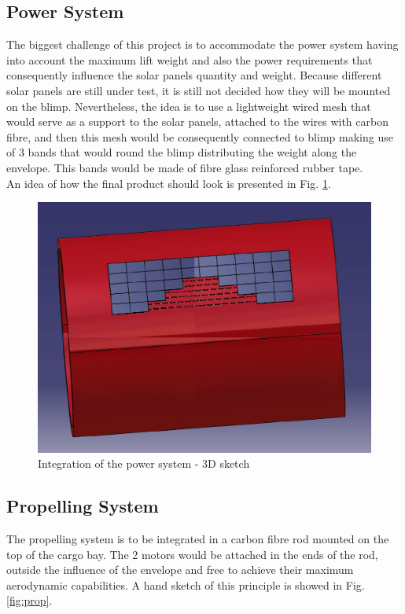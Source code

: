 \subsection{Power System}

The biggest challenge of this project is to accommodate the power system having into account the maximum lift weight and also the power requirements that consequently influence the solar panels quantity and weight. Because different solar panels are still under test, it is still not decided how they will be mounted on the blimp. Nevertheless, the idea is to use a lightweight wired mesh that would serve as a support to the solar panels, attached to the wires with carbon fibre, and then this mesh would be consequently connected to blimp making use of 3 bands that would round the blimp distributing the weight along the envelope. This bands would be made of fibre glass reinforced rubber tape. \\
An idea of how the final product should look is presented in Fig. \ref{fig:mesh}.

\begin{figure}[bht]
\centering
\includegraphics[scale=0.5]{figures/mesh.jpg}
\caption{Integration of the power system - 3D sketch}
\label{fig:mesh}
\end{figure}


\subsection{Propelling System}

The propelling system is to be integrated in a carbon fibre rod mounted on the top of the cargo bay. The 2 motors would be attached in the ends of the rod, outside the influence of the envelope and free to achieve their maximum aerodynamic capabilities. A hand sketch of this principle is showed in Fig.\ref{fig:prop}.

